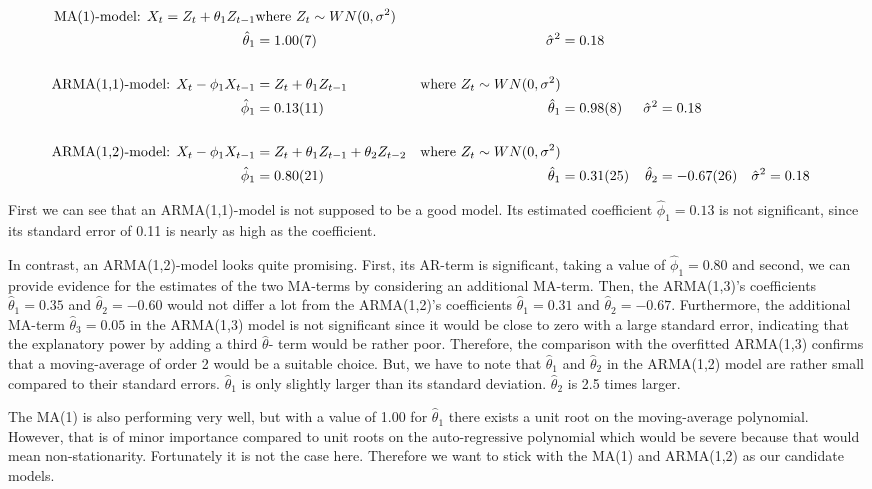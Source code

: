 \documentclass[11pt,a4paper]{article}
\begin{document}
\begin{align*}
   \text{MA(1)-model: } X_t = Z_t + \theta_1 Z_{t-1}
    & \text{where ${Z_t} \sim WN(0,\sigma^2)$}  \\
\hat{\theta}_1  &= \num{ 1.00 \pm 0.07}  &  \hat{\sigma}^2  &= \num{ 0.18 }
\\
\\
    \text{ARMA(1,1)-model: }X_t - \phi_1 X_{t-1} &= Z_t + \theta_1 Z_{t-1}
    & \text{where ${Z_t} \sim WN(0,\sigma^2)$} \\
\hat{\phi}_1    &= \num{ 0.13 \pm 0.11}  &  \hat{\theta}_1  &= \num{ 0.98 \pm 0.08}  &  \hat{\sigma}^2  &= \num{ 0.18 }
\\
\\
    \text{ARMA(1,2)-model: }X_t - \phi_1 X_{t-1} &= Z_t + \theta_1 Z_{t-1} + \theta_2 Z_{t-2}
    & \text{where ${Z_t} \sim WN(0,\sigma^2)$} \\
\hat{\phi}_1    &= \num{ 0.80 \pm 0.21}  &  \hat{\theta}_1  &= \num{ 0.31 \pm 0.25} & \hat{\theta}_2  &= \num{-0.67 \pm 0.26}  &  \hat{\sigma}^2  &= \num{0.18}   
\end{align*}

First we can see that an ARMA(1,1)-model is not supposed to be a good model. Its estimated coefficient $\hat{\phi}_1=0.13$ is not significant, since its standard error of 0.11 is nearly as high as the coefficient.

In contrast, an ARMA(1,2)-model looks quite promising. First, its AR-term is significant, taking a value of $\hat{\phi}_1=0.80$ and second, we can provide evidence for the estimates of the two MA-terms by considering an additional MA-term. Then, the ARMA(1,3)'s coefficients $\hat{\theta}_1 = 0.35$ and $\hat{\theta}_2= -0.60$ would not differ a lot from the ARMA(1,2)'s coefficients $\hat{\theta}_1 = 0.31$ and $\hat{\theta}_2 = -0.67$. Furthermore, the additional MA-term $\hat{\theta}_3 = 0.05$ in the ARMA(1,3) model is not significant since it would be close to zero with a large standard error, indicating that the explanatory power by adding a third $\hat{\theta}$- term would be rather poor. Therefore, the comparison with the overfitted ARMA(1,3) confirms that a moving-average of order 2 would be a suitable choice.
But, we have to note that $\hat{\theta}_1$ and $\hat{\theta}_2$ in the ARMA(1,2) model are rather small compared to their standard errors.
$\hat{\theta}_1$ is only slightly larger than its standard deviation.
$\hat{\theta}_2$ is 2.5 times larger.

The MA(1) is also performing very well, but with a value of 1.00 for $\hat{\theta}_1$ there exists a unit root on the moving-average polynomial. However, that is of minor importance compared to unit roots on the auto-regressive polynomial \cite[p.~42--83]{bd02} which would be severe because that would mean non-stationarity. Fortunately it is not the case here. Therefore we want to stick with the MA(1) and ARMA(1,2) as our candidate models.
\end{document}
